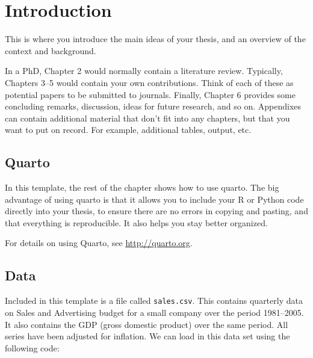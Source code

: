 \documentclass[
  11pt,
  a4paper,
  nottoc]{report}
\begin{document}
\clearpage{}\setcounter{page}{1}


\chapter{Introduction}\label{sec-intro}

This is where you introduce the main ideas of your thesis, and an
overview of the context and background.

In a PhD, Chapter 2 would normally contain a literature review.
Typically, Chapters 3--5 would contain your own contributions. Think of
each of these as potential papers to be submitted to journals. Finally,
Chapter 6 provides some concluding remarks, discussion, ideas for future
research, and so on. Appendixes can contain additional material that
don't fit into any chapters, but that you want to put on record. For
example, additional tables, output, etc.

\section{Quarto}\label{quarto}

In this template, the rest of the chapter shows how to use quarto. The
big advantage of using quarto is that it allows you to include your R or
Python code directly into your thesis, to ensure there are no errors in
copying and pasting, and that everything is reproducible. It also helps
you stay better organized.

For details on using Quarto, see \url{http://quarto.org}.

\section{Data}\label{data}

Included in this template is a file called \texttt{sales.csv}. This
contains quarterly data on Sales and Advertising budget for a small
company over the period 1981--2005. It also contains the GDP (gross
domestic product) over the same period. All series have been adjusted
for inflation. We can load in this data set using the following code:
\end{document}
